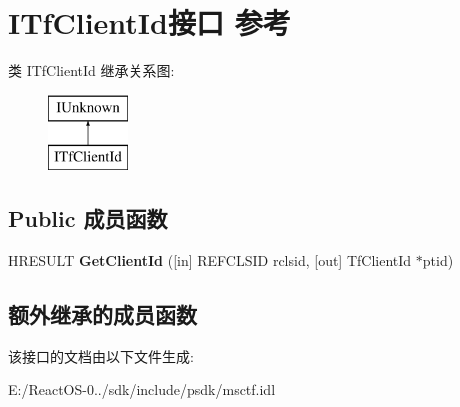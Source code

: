 \hypertarget{interface_i_tf_client_id}{}\section{I\+Tf\+Client\+Id接口 参考}
\label{interface_i_tf_client_id}
类 I\+Tf\+Client\+Id 继承关系图\+:\begin{figure}[H]
\begin{center}
\leavevmode
\includegraphics[height=2.000000cm]{interface_i_tf_client_id}
\end{center}
\end{figure}
\subsection*{Public 成员函数}
\begin{DoxyCompactItemize}
\item 
\mbox{\label{interface_i_tf_client_id_a0e5be7ee97c4fce28b2171d9ed8da9c6}} 
H\+R\+E\+S\+U\+LT {\bfseries Get\+Client\+Id} (\mbox{[}in\mbox{]} R\+E\+F\+C\+L\+S\+ID rclsid, \mbox{[}out\mbox{]} Tf\+Client\+Id $\ast$ptid)
\end{DoxyCompactItemize}
\subsection*{额外继承的成员函数}


该接口的文档由以下文件生成\+:\begin{DoxyCompactItemize}
\item 
E\+:/\+React\+O\+S-\/0../sdk/include/psdk/msctf.\+idl\end{DoxyCompactItemize}
